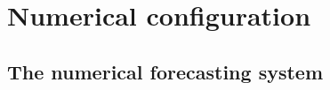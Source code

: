 \documentclass[a4paper,12pt]{article}
\begin{document}




\section{Numerical configuration}

\subsection{The numerical forecasting system}

\end{document}
